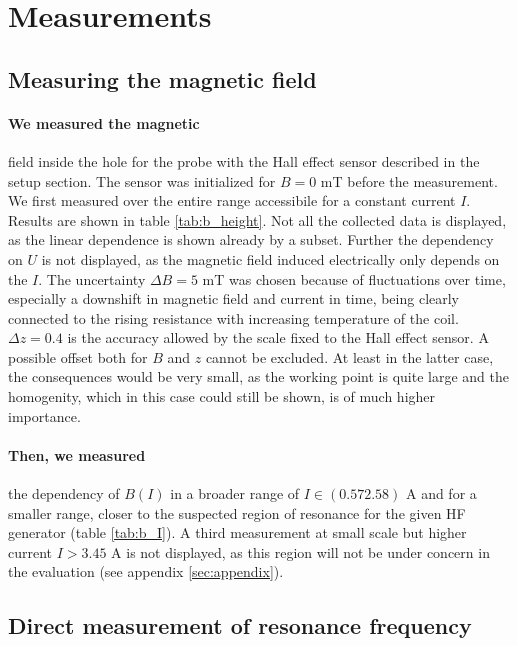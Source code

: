 \section{Measurements}

\subsection{Measuring the magnetic field}
\paragraph{We measured the magnetic} 
field inside the hole for the probe with the Hall effect sensor described in the setup section. 
The sensor was initialized for $B = 0$ mT before the measurement. We first measured over the 
entire range accessibile for a constant current $I$. Results are shown in table \ref{tab:b_height}. 
Not all the collected data is displayed, as the linear dependence is shown already by a subset. Further 
the dependency on $U$ is not displayed, as the magnetic field induced electrically only depends on the 
$I$. The uncertainty $\Delta B = 5$ mT was chosen because of fluctuations over time, especially a 
downshift in magnetic field and current in time, being clearly connected to the rising resistance with 
increasing temperature of the coil. $\Delta z = 0.4$ is the accuracy allowed by the scale fixed to the 
Hall effect sensor. A possible offset both for $B$ and $z$ cannot be excluded. At least in the latter case, 
the consequences would be very small, as the working point is quite large and the homogenity, which 
in this case could still be shown, is of much higher importance. 

 
\paragraph{Then, we measured} 
the dependency of $B(I)$ in a broader range of $I \in (0.57 2.58)$ A 
and for a smaller range, closer to the suspected region of resonance 
for the given HF generator (table \ref{tab:b_I}). A third measurement at small scale 
but higher current $I > 3.45$ A is not displayed, as this region will not be under 
concern in the evaluation (see appendix \ref{sec:appendix}). 

\FloatBarrier

\subsection{Direct measurement of resonance frequency}
